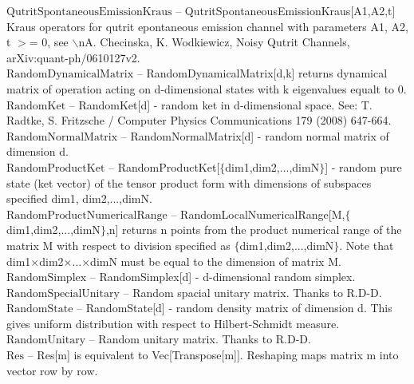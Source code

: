 \documentclass[a4paper,10pt]{scrartcl}
\begin{document}
\textbf{$ \text{QutritSpontaneousEmissionKraus} $ }-- QutritSpontaneousEmissionKraus[A1,A2,t] Kraus operators for qutrit epontaneous emission channel with parameters A1, A2, t $>$= 0, see $\backslash $nA. Checinska, K. Wodkiewicz, Noisy Qutrit Channels, arXiv:quant-ph/0610127v2.$  $\\

\textbf{$ \text{RandomDynamicalMatrix} $ }-- RandomDynamicalMatrix[d,k] returns dynamical matrix of operation acting on d-dimensional states with k eigenvalues equalt to 0.$  $\\

\textbf{$ \text{RandomKet} $ }-- RandomKet[d] - random ket in d-dimensional space. See: T. Radtke, S. Fritzsche / Computer Physics Communications 179 (2008) 647-664.$  $\\

\textbf{$ \text{RandomNormalMatrix} $ }-- RandomNormalMatrix[d] - random normal matrix of dimension d.$  $\\

\textbf{$ \text{RandomProductKet} $ }-- RandomProductKet[$\{$dim1,dim2,...,dimN$\}$] - random pure state (ket vector) of the tensor product form with dimensions of subspaces specified dim1, dim2,...,dimN.$  $\\

\textbf{$ \text{RandomProductNumericalRange} $ }-- RandomLocalNumericalRange[M,$\{$dim1,dim2,...,dimN$\}$,n] returns n points from the product numerical range of the matrix M with respect to division specified as $\{$dim1,dim2,...,dimN$\}$. Note that dim1$\times $dim2$\times $...$\times $dimN must be equal to the dimension of matrix M.$  $\\

\textbf{$ \text{RandomSimplex} $ }-- RandomSimplex[d] - d-dimensional random simplex.$  $\\

\textbf{$ \text{RandomSpecialUnitary} $ }-- Random spacial unitary matrix. Thanks to R.D-D.$  $\\

\textbf{$ \text{RandomState} $ }-- RandomState[d] - random density matrix of dimension d. This gives uniform distribution with respect to Hilbert-Schmidt measure.$  $\\

\textbf{$ \text{RandomUnitary} $ }-- Random unitary matrix. Thanks to R.D-D.$  $\\

\textbf{$ \text{Res} $ }-- Res[m] is equivalent to Vec[Transpose[m]]. Reshaping maps matrix m into vector row by row.$  $\\
\end{document}
